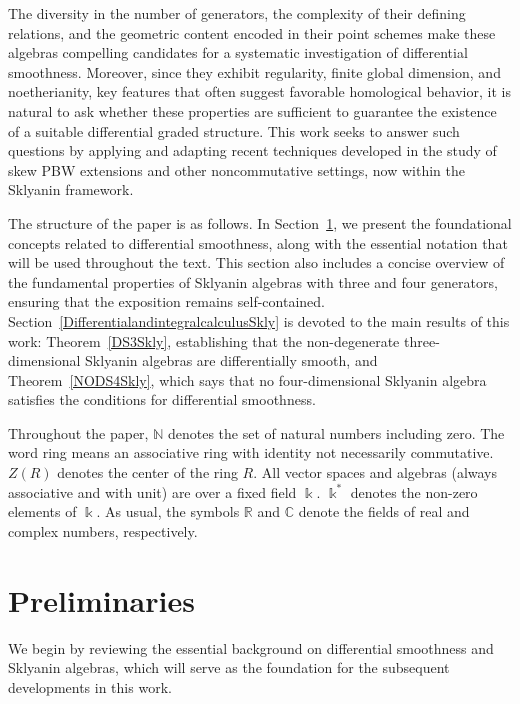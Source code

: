 \documentclass{amsart}
\theoremstyle{definition}
\theoremstyle{remark}
\numberwithin{equation}{section}
\begin{document}
The diversity in the number of generators, the complexity of their defining relations, and the geometric content encoded in their point schemes make these algebras compelling candidates for a systematic investigation of differential smoothness. Moreover, since they exhibit regularity, finite global dimension, and noetherianity, key features that often suggest favorable homological behavior, it is natural to ask whether these properties are sufficient to guarantee the existence of a suitable differential graded structure. This work seeks to answer such questions by applying and adapting recent techniques developed in the study of skew PBW extensions and other noncommutative settings, now within the Sklyanin framework.


The structure of the paper is as follows. In Section~\ref{PreliminariesDifferentialsmoothnessofbi-quadraticalgebras}, we present the foundational concepts related to differential smoothness, along with the essential notation that will be used throughout the text. This section also includes a concise overview of the fundamental properties of Sklyanin algebras with three and four generators, ensuring that the exposition remains self-contained. Section~\ref{DifferentialandintegralcalculusSkly} is devoted to the main results of this work: Theorem~\ref{DS3Skly}, establishing that the non-degenerate three-dimensional Sklyanin algebras are differentially smooth, and Theorem~\ref{NODS4Skly}, which says that no four-dimensional Sklyanin algebra satisfies the conditions for differential smoothness.

Throughout the paper, $\mathbb{N}$ denotes the set of natural numbers including zero. The word ring means an associative ring with identity not necessarily commutative. $Z(R)$ denotes the center of the ring $R$. All vector spaces and algebras (always associative and with unit) are over a fixed field $\Bbbk$. $\Bbbk^{*}$ denotes the non-zero elements of $\Bbbk$. As usual, the symbols $\mathbb{R}$ and $\mathbb{C}$ denote the fields of real and complex numbers, respectively. 


\section{Preliminaries}\label{PreliminariesDifferentialsmoothnessofbi-quadraticalgebras}

We begin by reviewing the essential background on differential smoothness and Sklyanin algebras, which will serve as the foundation for the subsequent developments in this work.
\end{document}
